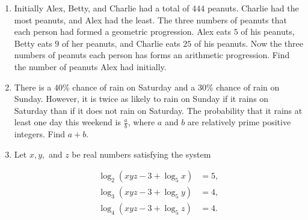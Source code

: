 \documentclass{article}
\begin{document}
\begin{enumerate}[label=\arabic*., itemsep=0.5em]\item Initially Alex, Betty, and Charlie had a total of \(444\) peanuts. Charlie had the most peanuts, and Alex had the least. The three numbers of peanuts that each person had formed a geometric progression. Alex eats \(5\) of his peanuts, Betty eats \(9\) of her peanuts, and Charlie eats \(25\) of his peanuts. Now the three numbers of peanuts each person has forms an arithmetic progression. Find the number of peanuts Alex had initially.\par \vspace{0.5em}\item There is a \(40\%\) chance of rain on Saturday and a \(30\%\) chance of rain on Sunday. However, it is twice as likely to rain on Sunday if it rains on Saturday than if it does not rain on Saturday. The probability that it rains at least one day this weekend is \(\frac{a}{b}\), where \(a\) and \(b\) are relatively prime positive integers. Find \(a+b\).\par \vspace{0.5em}\item Let \(x,y,\) and \(z\) be real numbers satisfying the system

\begin{align*}
\log_2(xyz-3+\log_5 x)&=5,\\
\log_3(xyz-3+\log_5 y)&=4,\\
\log_4(xyz-3+\log_5 z)&=4.
\end{align*}


\end{enumerate}
\end{document}
